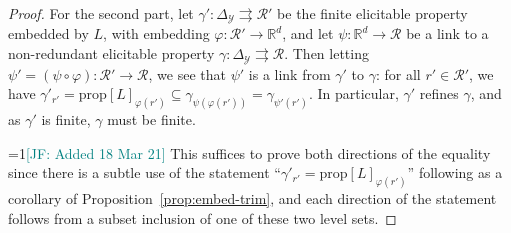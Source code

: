 \documentclass[11pt]{article}
\newcommand{\Comments}{1}
\newcommand{\mynote}[2]{\ifnum\Comments=1\textcolor{#1}{#2}\fi}
\newcommand{\mytodo}[2]{\ifnum\Comments=1%
  \todo[linecolor=#1!80!black,backgroundcolor=#1,bordercolor=#1!80!black]{#2}\fi}
\newcommand{\raft}[1]{\mytodo{green!20!white}{RF: #1}}
\newcommand{\jessie}[1]{\mynote{teal}{[JF: #1]}}
\newcommand{\jessiet}[1]{\mytodo{teal!20!white}{JF: #1}}
\newcommand{\reals}{\mathbb{R}}
\newcommand{\prop}[1]{\mathrm{prop}[#1]}
\newcommand{\simplex}{\Delta_\Y}
\newcommand{\R}{\mathcal{R}}
\newcommand{\Y}{\mathcal{Y}}
\newcommand{\toto}{\rightrightarrows}
\begin{document}
\begin{proof}
	
	For the second part, let $\gamma':\simplex\toto\R'$ be the finite elicitable property embedded by $L$, with embedding $\varphi:\R'\to\reals^d$, and let $\psi:\reals^d \to \R$ be a link to a non-redundant elicitable property $\gamma:\simplex\toto\R$.
	Then letting $\psi' = (\psi \circ \varphi):\R'\to\R$, we see that $\psi'$ is a link from $\gamma'$ to $\gamma$:
	for all $r'\in\R'$, we have $\gamma'_{r'} = \prop{L}_{\varphi(r')} \subseteq \gamma_{\psi(\varphi(r'))} = \gamma_{\psi'(r')}$.
	In particular, $\gamma'$ refines $\gamma$, and as $\gamma'$ is finite, $\gamma$ must be finite.
	
	\jessie{Added 18 Mar 21}
	This suffices to prove both directions of the equality since there is a subtle use of the statement ``$\gamma'_{r'} = \prop{L}_{\varphi(r')}$'' following as a corollary of Proposition~\ref{prop:embed-trim}, and each direction of the statement follows from a subset inclusion of one of these two level sets. 
	
\end{proof}
\end{document}

